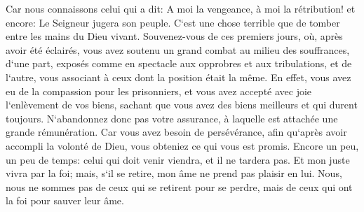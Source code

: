 \verse Car nous connaissons celui qui a dit: A moi la vengeance, à moi la rétribution! et encore: Le Seigneur jugera son peuple. 
\verse C`est une chose terrible que de tomber entre les mains du Dieu vivant. 
\verse Souvenez-vous de ces premiers jours, où, après avoir été éclairés, vous avez soutenu un grand combat au milieu des souffrances, 
\verse d`une part, exposés comme en spectacle aux opprobres et aux tribulations, et de l`autre, vous associant à ceux dont la position était la même. 
\verse En effet, vous avez eu de la compassion pour les prisonniers, et vous avez accepté avec joie l`enlèvement de vos biens, sachant que vous avez des biens meilleurs et qui durent toujours. 
\verse N`abandonnez donc pas votre assurance, à laquelle est attachée une grande rémunération. 
\verse Car vous avez besoin de persévérance, afin qu`après avoir accompli la volonté de Dieu, vous obteniez ce qui vous est promis. 
\verse Encore un peu, un peu de temps: celui qui doit venir viendra, et il ne tardera pas. 
\verse Et mon juste vivra par la foi; mais, s`il se retire, mon âme ne prend pas plaisir en lui. 
\verse Nous, nous ne sommes pas de ceux qui se retirent pour se perdre, mais de ceux qui ont la foi pour sauver leur âme. 

